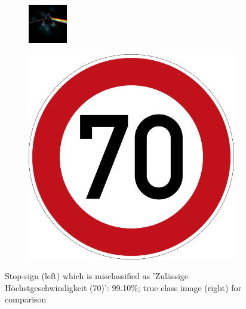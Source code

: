 \begin{figure}[h]
\centering
\begin{subfigure}{.19\linewidth}
  \centering
  \includegraphics[width=0.7\linewidth]{imgs/7}
\end{subfigure}
\begin{subfigure}{.19\linewidth}
  \centering
  \includegraphics[width=0.7\linewidth]{imgs/7_real}
\end{subfigure}
\caption{Stop-sign (left) which is misclassified as 'Zulässige Höchstgeschwindigkeit (70)': 99.10\%; true class image (right) for comparison}
\label{fig:stopsign}
\end{figure}

